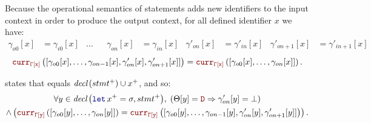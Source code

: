 \begin{skippableproof}
\begin{itemize}
              Because the operational semantics of statements adds new identifiers to the input
              context in order to produce the output context,
              for all defined identifier $x$ we have:
              \begin{align*}
                  \gamma_{o0}[x]    & = \gamma_{i0}[x]    &
                  \dots             &                     &
                  \gamma_{on}[x]    & = \gamma_{in}[x]    &
                  \gamma'_{on}[x]   & = \gamma'_{in}[x]   &
                  \gamma'_{on+1}[x] & = \gamma'_{in+1}[x]
              \end{align*}
              \begin{equation*}
                  \CurrVal{\tyCtx[x]}{[\gamma_{o0}[x], \dots, \gamma_{on-1}[x], \gamma'_{on}[x], \gamma'_{on+1}[x]]} = \CurrVal{\tyCtx[x]}{[\gamma_{o0}[x], \dots, \gamma_{on}[x]]}.
              \end{equation*}

               states that
               equals ${\textit{decl}\left(stmt^+\right)} \cup {x^+}$, and so:
              \begin{multline*}
                  \forall y \in \declSet{\decl{x^+}{\sigma}, stmt^+}, \; \left(\Theta[y] = \dType \Rightarrow \gamma'_{on}[y] = \bot\right) \\
                  \wedge \left(\CurrVal{\tyCtx[y]}{[\gamma_{o0}[y], \dots, \gamma_{on}[y]]} = \CurrVal{\tyCtx[y]}{[\gamma_{o0}[y], \dots, \gamma_{on-1}[y], \gamma'_{on}[y], \gamma'_{on+1}[y]]}\right).
              \end{multline*}
    \end{itemize}
\end{skippableproof}

